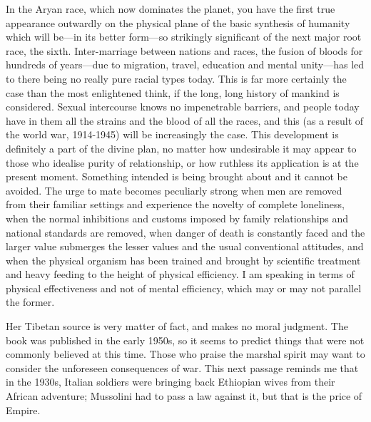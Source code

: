 \begin{quotex} 
In the Aryan race, which now dominates the planet, you have the first true appearance outwardly on the physical plane of the basic synthesis of humanity which will be---in its better form---so strikingly significant of the next major root race, the sixth. Inter-marriage between nations and races, the fusion of bloods for hundreds of years---due to migration, travel, education and mental unity---has led to there being no really pure racial types today. This is far more certainly the case than the most enlightened think, if the long, long history of mankind is considered. Sexual intercourse knows no impenetrable barriers, and people today have in them all the strains and the blood of all the races, and this (as a result of the world war, 1914-1945) will be increasingly the case. This development is definitely a part of the divine plan, no matter how undesirable it may appear to those who idealise purity of relationship, or how ruthless its application is at the present moment. Something intended is being brought about and it cannot be avoided. The urge to mate becomes peculiarly strong when men are removed from their familiar settings and experience the novelty of complete loneliness, when the normal inhibitions and customs imposed by family relationships and national standards are removed, when danger of death is constantly faced and the larger value submerges the lesser values and the usual conventional attitudes, and when the physical organism has been trained and brought by scientific treatment and heavy feeding to the height of physical efficiency. I am speaking in terms of physical effectiveness and not of mental efficiency, which may or may not parallel the former.
\end{quotex}


Her Tibetan source is very matter of fact, and makes no moral judgment. The book was published in the early 1950s, so it seems to predict things that were not commonly believed at this time. Those who praise the marshal spirit may want to consider the unforeseen consequences of war. This next passage reminds me that in the 1930s, Italian soldiers were bringing back Ethiopian wives from their African adventure; Mussolini had to pass a law against it, but that is the price of Empire.

